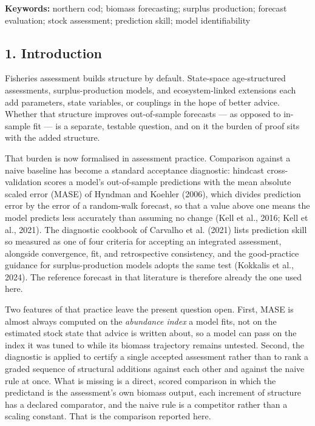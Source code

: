 \documentclass[11pt]{article}
\begin{document}
\textbf{Keywords:} northern cod; biomass forecasting; surplus
production; forecast evaluation; stock assessment; prediction skill;
model identifiability

\subsection{1. Introduction}\label{introduction}

Fisheries assessment builds structure by default. State-space
age-structured assessments, surplus-production models, and
ecosystem-linked extensions each add parameters, state variables, or
couplings in the hope of better advice. Whether that structure improves
out-of-sample forecasts --- as opposed to in-sample fit --- is a
separate, testable question, and on it the burden of proof sits with the
added structure.

That burden is now formalised in assessment practice. Comparison against
a naive baseline has become a standard acceptance diagnostic: hindcast
cross-validation scores a model's out-of-sample predictions with the
mean absolute scaled error (MASE) of Hyndman and Koehler (2006), which
divides prediction error by the error of a random-walk forecast, so that
a value above one means the model predicts less accurately than assuming
no change (Kell et al., 2016; Kell et al., 2021). The diagnostic
cookbook of Carvalho et al. (2021) lists prediction skill so measured as
one of four criteria for accepting an integrated assessment, alongside
convergence, fit, and retrospective consistency, and the good-practice
guidance for surplus-production models adopts the same test (Kokkalis
et al., 2024). The reference forecast in that literature is therefore
already the one used here.

Two features of that practice leave the present question open. First,
MASE is almost always computed on the \emph{abundance index} a model
fits, not on the estimated stock state that advice is written about, so
a model can pass on the index it was tuned to while its biomass
trajectory remains untested. Second, the diagnostic is applied to
certify a single accepted assessment rather than to rank a graded
sequence of structural additions against each other and against the
naive rule at once. What is missing is a direct, scored comparison in
which the predictand is the assessment's own biomass output, each
increment of structure has a declared comparator, and the naive rule is
a competitor rather than a scaling constant. That is the comparison
reported here.
\end{document}

